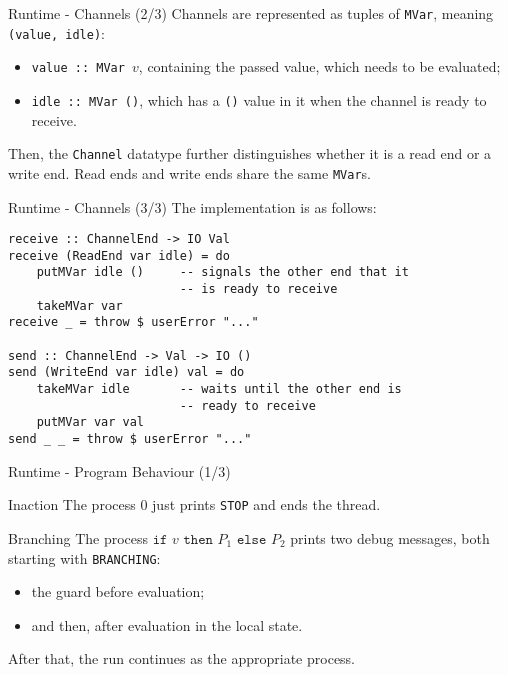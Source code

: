\begin{frame}{Runtime - Channels (2/3)}
    Channels are represented as tuples of \texttt{MVar}, meaning \texttt{(value, idle)}:
    \begin{itemize}
        \item \texttt{value :: MVar }$v$, containing the passed value, which needs to be evaluated;
        \item \texttt{idle :: MVar ()}, which has a \texttt{()} value in it when the channel is ready to receive.
    \end{itemize}
    Then, the \texttt{Channel} datatype further distinguishes whether it is a read end or a write end. Read ends and write ends share the same \texttt{MVar}s.
\end{frame}

\begin{frame}[fragile]{Runtime - Channels (3/3)}
    The implementation is as follows:
    \begin{verbatim}
receive :: ChannelEnd -> IO Val
receive (ReadEnd var idle) = do
    putMVar idle ()     -- signals the other end that it 
                        -- is ready to receive
    takeMVar var
receive _ = throw $ userError "..."

send :: ChannelEnd -> Val -> IO ()
send (WriteEnd var idle) val = do
    takeMVar idle       -- waits until the other end is 
                        -- ready to receive
    putMVar var val
send _ _ = throw $ userError "..."
    \end{verbatim}
\end{frame}

\begin{frame}{Runtime - Program Behaviour (1/3)}
    \begin{block}{Inaction}
        The process $0$ just prints \texttt{STOP} and ends the thread.
    \end{block}

    \begin{block}{Branching}
        The process $\texttt{if }v\texttt{ then }P_1\texttt{ else }P_2$ prints two debug messages, both starting with \texttt{BRANCHING}:
        \begin{itemize}
            \item the guard before evaluation;
            \item and then, after evaluation in the local state.
        \end{itemize}
        After that, the run continues as the appropriate process.
    \end{block}
\end{frame}

